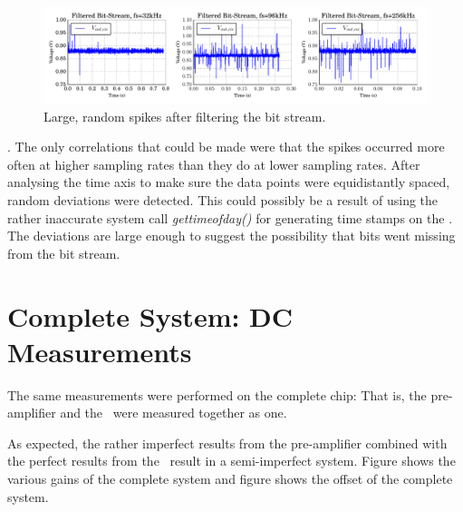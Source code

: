 \begin{figure}
    \centering
    \includegraphics[width=\linewidth]{images/plots/noisy_bitstream.pdf}
    \caption{Large, random spikes after filtering the bit stream.}
    \label{fig:noisy_sigdel}
\end{figure}
.
The only correlations that could  be  made  were that the
spikes  occurred  more  often  at  higher sampling rates than they do at lower
sampling rates. After analysing the time axis  to  make  sure  the data points
were  equidistantly  spaced,  random  deviations  were  detected.  This  could
possibly   be   a  result  of  using  the  rather   inaccurate   system   call
\textit{gettimeofday()}  for  generating  time  stamps  on  the   \raspi.  The
deviations are large enough to  suggest the possibility that bits went missing
from the bit stream.

\section{Complete System: DC Measurements}
\label{sec:systemDC}

The  same  measurements  were  performed  on  the complete chip: That is,  the
pre-amplifier and the \sdm~were measured together as one.

As expected, the rather imperfect results from the pre-amplifier combined with
the  perfect  results  from the \sdm~result in a semi-imperfect system. Figure
 shows the various gains  of
the complete system and  figure  
shows the offset of the complete system.
